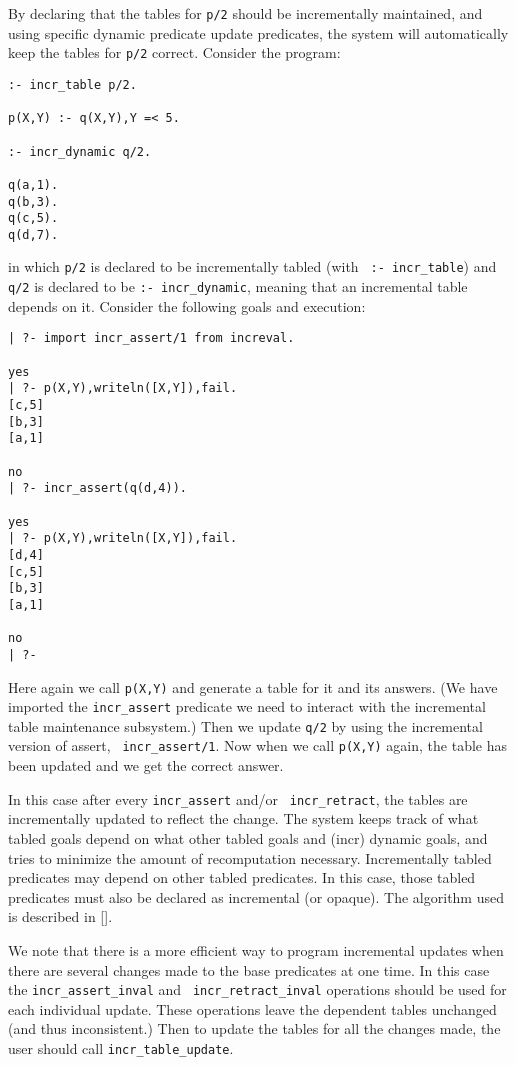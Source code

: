 By declaring that the tables for {\tt p/2} should be incrementally
maintained, and using specific dynamic predicate update predicates,
the system will automatically keep the tables for {\tt p/2} correct.
Consider the program:
\begin{verbatim}
:- incr_table p/2.

p(X,Y) :- q(X,Y),Y =< 5.

:- incr_dynamic q/2.

q(a,1).
q(b,3).
q(c,5).
q(d,7).
\end{verbatim}
in which {\tt p/2} is declared to be incrementally tabled (with {\tt
:- incr\_table}) and {\tt q/2} is declared to be {\tt :-
incr\_dynamic}, meaning that an incremental table depends on it.
Consider the following goals and execution:
\begin{verbatim}
| ?- import incr_assert/1 from increval.

yes
| ?- p(X,Y),writeln([X,Y]),fail.
[c,5]
[b,3]
[a,1]

no
| ?- incr_assert(q(d,4)).

yes
| ?- p(X,Y),writeln([X,Y]),fail.
[d,4]
[c,5]
[b,3]
[a,1]

no
| ?- 
\end{verbatim}
Here again we call {\tt p(X,Y)} and generate a table for it and its
answers.  (We have imported the {\tt incr\_assert} predicate we need
to interact with the incremental table maintenance subsystem.)  Then
we update {\tt q/2} by using the incremental version of assert, {\tt
incr\_assert/1}.  Now when we call {\tt p(X,Y)} again, the table has
been updated and we get the correct answer.

In this case after every {\tt incr\_assert} and/or {\tt
incr\_retract}, the tables are incrementally updated to reflect the
change.  The system keeps track of what tabled goals depend on what
other tabled goals and (incr) dynamic goals, and tries to minimize the
amount of recomputation necessary.  Incrementally tabled predicates
may depend on other tabled predicates.  In this case, those tabled
predicates must also be declared as incremental (or opaque).  The
algorithm used is described in [].

We note that there is a more efficient way to program incremental
updates when there are several changes made to the base predicates at
one time.  In this case the {\tt incr\_assert\_inval} and {\tt
incr\_retract\_inval} operations should be used for each individual
update.  These operations leave the dependent tables unchanged (and
thus inconsistent.)  Then to update the tables for all the changes
made, the user should call {\tt incr\_table\_update}.

